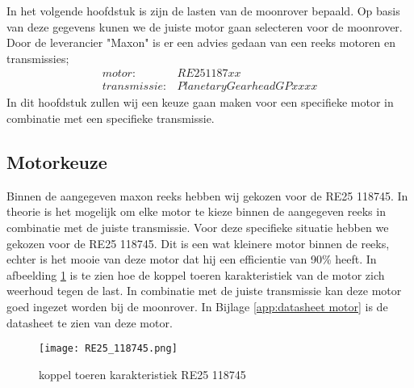 In het volgende hoofdstuk is zijn de lasten van de moonrover bepaald. Op basis van deze gegevens kunen we de juiste motor gaan selecteren voor de moonrover. Door de leverancier "Maxon" is er een advies gedaan van een reeks motoren en transmissies;
\begin{align*}
        motor: &RE25 1187xx\\
        transmissie: &Planetary Gearhead GP xx xx
\end{align*}
In dit hoofdstuk zullen wij een keuze gaan maken voor een specifieke motor in combinatie met een specifieke transmissie.


\subsection{Motorkeuze}
Binnen de aangegeven maxon reeks hebben wij gekozen voor de RE25 118745. In theorie is het mogelijk om elke motor te kieze binnen de aangegeven reeks in combinatie met de juiste transmissie. Voor deze specifieke situatie hebben we gekozen voor de RE25 118745. Dit is een wat kleinere motor binnen de reeks, echter is het mooie van deze motor dat hij een efficientie van 90\% heeft. In afbeelding \ref{fig:RE25_118745} is te zien hoe de koppel toeren karakteristiek van de motor zich weerhoud tegen de last. In combinatie met de juiste transmissie kan deze motor goed ingezet worden bij de moonrover. In Bijlage \ref{app:datasheet motor} is de datasheet te zien van deze motor.
        \begin{figure}[H]
                \centering
                \texttt{[image: RE25\_118745.png]}
                \caption{koppel toeren karakteristiek RE25 118745}
                \label{fig:RE25_118745}
        \end{figure}

\newpage

